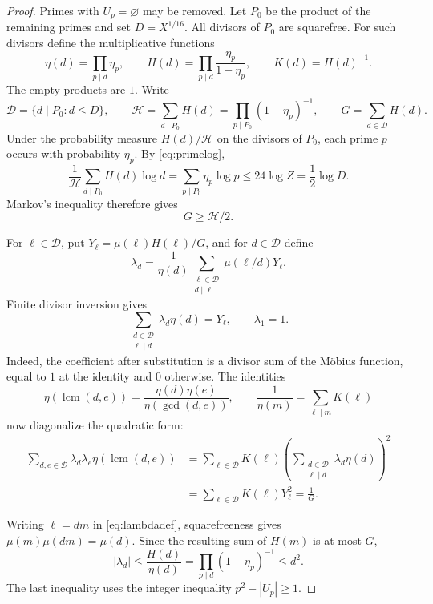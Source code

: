 \documentclass[11pt]{amsart}
\theoremstyle{definition}
\theoremstyle{remark}
\numberwithin{equation}{section}
\DeclareMathOperator{\lcm}{lcm}
\begin{document}
\begin{proof}
Primes with $U_p=\varnothing$ may be removed.
Let $P_0$ be the product of the remaining primes and set $D=X^{1/16}$.
All divisors of $P_0$ are squarefree.
For such divisors define the multiplicative functions
\[
\eta(d)=\prod_{p\mid d}\eta_p,
\qquad H(d)=\prod_{p\mid d}\frac{\eta_p}{1-\eta_p},
\qquad K(d)=H(d)^{-1}.
\]
The empty products are $1$.
Write
\[
\mathcal D=\{d\mid P_0:d\le D\},\qquad
\mathcal H=\sum_{d\mid P_0}H(d)=\prod_{p\mid P_0}(1-\eta_p)^{-1},\qquad
G=\sum_{d\in\mathcal D}H(d).
\]
Under the probability measure $H(d)/\mathcal H$ on the divisors of $P_0$, each prime $p$ occurs with probability $\eta_p$.
By \eqref{eq:primelog},
\[
\frac1{\mathcal H}\sum_{d\mid P_0}H(d)\log d
=\sum_{p\mid P_0}\eta_p\log p
\le24\log Z=\frac12\log D.
\]
Markov's inequality therefore gives
\begin{equation}\label{eq:halfmass}
G\ge\mathcal H/2.
\end{equation}

For $\ell\in\mathcal D$, put $Y_\ell=\mu(\ell)H(\ell)/G$, and for $d\in\mathcal D$ define
\begin{equation}\label{eq:lambdadef}
\lambda_d=\frac1{\eta(d)}\sum_{\substack{\ell\in\mathcal D\\d\mid\ell}}\mu(\ell/d)Y_\ell.
\end{equation}
Finite divisor inversion gives
\begin{equation}\label{eq:lambdaidentity}
\sum_{\substack{d\in\mathcal D\\\ell\mid d}}\lambda_d\eta(d)=Y_\ell,
\qquad \lambda_1=1.
\end{equation}
Indeed, the coefficient after substitution is a divisor sum of the M\"obius function, equal to $1$ at the identity and $0$ otherwise.
The identities
\[
\eta(\lcm(d,e))=\frac{\eta(d)\eta(e)}{\eta(\gcd(d,e))},
\qquad \frac1{\eta(m)}=\sum_{\ell\mid m}K(\ell)
\]
now diagonalize the quadratic form:
\begin{equation}\label{eq:quadratic}
\begin{split}
\sum_{d,e\in\mathcal D}\lambda_d\lambda_e\eta(\lcm(d,e))
&=\sum_{\ell\in\mathcal D}K(\ell)
\left(\sum_{\substack{d\in\mathcal D\\\ell\mid d}}\lambda_d\eta(d)\right)^2\\
&=\sum_{\ell\in\mathcal D}K(\ell)Y_\ell^2=\frac1G.
\end{split}
\end{equation}

Writing $\ell=dm$ in \eqref{eq:lambdadef}, squarefreeness gives
$\mu(m)\mu(dm)=\mu(d)$.
Since the resulting sum of $H(m)$ is at most $G$,
\begin{equation}\label{eq:lambdabound}
|\lambda_d|\le\frac{H(d)}{\eta(d)}
=\prod_{p\mid d}(1-\eta_p)^{-1}\le d^2.
\end{equation}
The last inequality uses the integer inequality $p^2-|U_p|\ge1$.


\end{proof}
\end{document}
